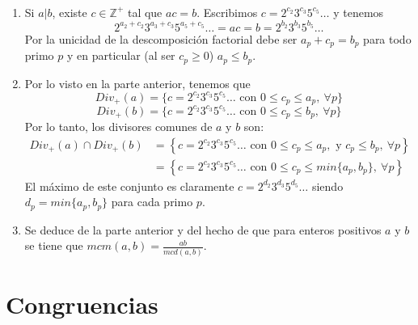 \documentclass{report}
\begin{document}
\begin{myproof}
	\ \\
	\begin{enumerate}
		\item Si $a|b$, existe $c\in\mathbb{Z}^+$ tal que $ac=b$. Escribimos $c=2^{c_2}3^{c_3}5^{c_5}\dots$ y tenemos $$2^{a_2+c_2}3^{a_3+c_3}5^{a_5+c_5}\dots=ac=b=2^{b_2}3^{b_3}5^{b_5}\dots$$Por la unicidad de la descomposición factorial debe ser $a_p+c_p=b_p$ para todo primo $p$ y en particular (al ser $c_p\ge0$) $a_p\le b_p$.
		\item Por lo visto en la parte anterior, tenemos que $$Div_+(a)=\{c=2^{c_2}3^{c_3}5^{c_5}\dots\text{ con }0\le c_p\le a_p,\ \forall p\}$$$$Div_+(b)=\{c=2^{c_2}3^{c_3}5^{c_5}\dots\text{ con }0\le c_p\le b_p,\ \forall p\}$$Por lo tanto, los divisores comunes de $a$ y $b$ son:$$\begin{aligned} Div_{+}( a) \cap Div_{+}( b) & =\left\{c=2^{c_{2}} 3^{c_{3}} 5^{c_{5}} \dotsc \text{ con } 0\leq c_{p} \leq a_{p} ,\text{ y } c_{p} \leq b_{p} ,\ \forall p\right\}\\  & =\left\{c=2^{c_{2}} 3^{c_{3}} 5^{c_{5}} \dotsc \text{ con } 0\leq c_{p} \leq min\{a_{p} ,b_{p}\} ,\ \forall p\right\} \end{aligned}$$El máximo de este conjunto es claramente $c=2^{d_2}3^{d_3}5^{d_5}\dots$ siendo $d_p=min\{a_p,b_p\}$ para cada primo $p$.
		\item Se deduce de la parte anterior y del hecho de que para enteros positivos $a$ y $b$ se tiene que $mcm(a,b)=\frac{ab}{mcd(a,b)}$.
	\end{enumerate}
\end{myproof}
\newpage
\chapter{Congruencias}
\end{document}
